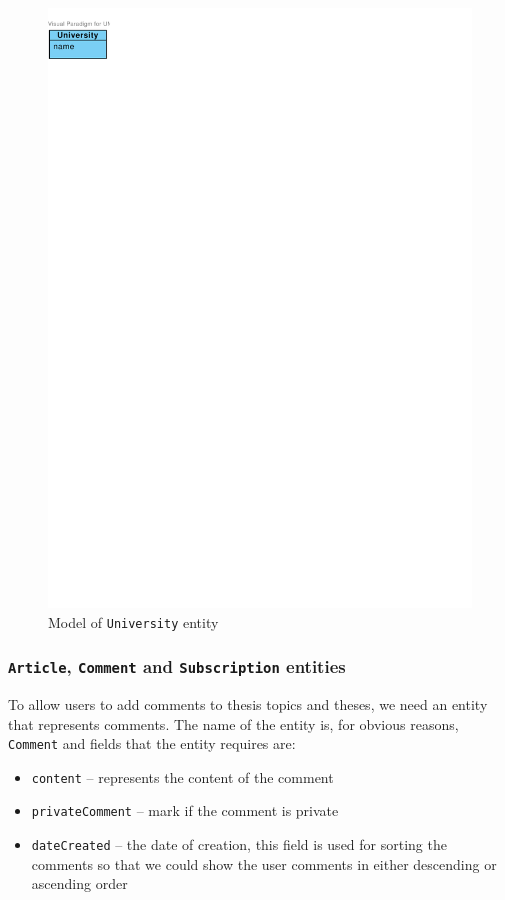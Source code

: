 \begin{figure}[h]
    \centering
        \includegraphics[trim=0 770 510 30, clip, keepaspectratio]{./images/domain-university-entity.pdf}
    \caption{Model of \texttt{University} entity}
    \label{fig:domain-university-entity}
\end{figure}

\subsubsection{\texttt{Article}, \texttt{Comment} and \texttt{Subscription} entities}

To allow users to add comments to thesis topics and theses, we need an entity that represents comments. The name of the entity is, for obvious reasons, \texttt{Comment} and fields that the entity requires are:

\begin{itemize}
    \item \texttt{content} -- represents the content of the comment
    \item \texttt{privateComment} -- mark if the comment is private
    \item \texttt{dateCreated} -- the date of creation, this field is used for sorting the comments so that we could show the user comments in either descending or ascending order
\end{itemize}

